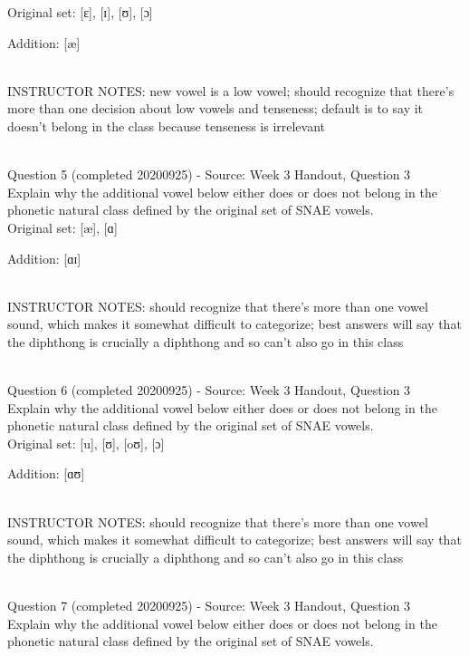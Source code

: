\documentclass[12pt]{article}
\begin{document}
Original set: {[ɛ]}, {[ɪ]}, {[ʊ]}, {[ɔ]}

Addition: {[æ]}


~\\
INSTRUCTOR NOTES: new vowel is a low vowel; should recognize that there's more than one decision about low vowels and tenseness; default is to say it doesn't belong in the class because tenseness is irrelevant


~\\

{\large Question 5} (completed 20200925) - Source: Week 3 Handout, Question 3\\

Explain why the additional vowel below either does or does not belong in the phonetic natural class defined by the original set of SNAE vowels.\\

Original set: {[æ]}, {[ɑ]}

Addition: {[ɑɪ]}


~\\
INSTRUCTOR NOTES: should recognize that there's more than one vowel sound, which makes it somewhat difficult to categorize; best answers will say that the diphthong is crucially a diphthong and so can't also go in this class


~\\

{\large Question 6} (completed 20200925) - Source: Week 3 Handout, Question 3\\

Explain why the additional vowel below either does or does not belong in the phonetic natural class defined by the original set of SNAE vowels.\\

Original set: {[u]}, {[ʊ]}, {[oʊ]}, {[ɔ]}

Addition: {[ɑʊ]}


~\\
INSTRUCTOR NOTES: should recognize that there's more than one vowel sound, which makes it somewhat difficult to categorize; best answers will say that the diphthong is crucially a diphthong and so can't also go in this class


~\\

{\large Question 7} (completed 20200925) - Source: Week 3 Handout, Question 3\\

Explain why the additional vowel below either does or does not belong in the phonetic natural class defined by the original set of SNAE vowels.\\
\end{document}
